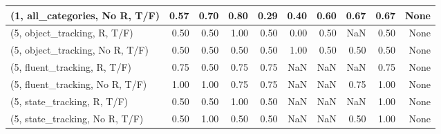 \begin{table*}[h!]
\begin{adjustbox}{width=2\columnwidth,center}
\begin{tabular}{lrrr|rrr|rrr}
(1, all\_categories, No R, T/F)       &                      0.57 &                  0.70 &                      0.80 &                          0.29 &                      0.40 &                          0.60 &                                   0.67 &                               0.67 &                                  None \\



\midrule
(5, object\_tracking, R, T/F)         &                      0.50 &                  0.50 &                      1.00 &                          0.50 &                      0.00 &                          0.50 &                                    NaN &                               0.50 &                                  None \\
(5, object\_tracking, No R, T/F)      &                      0.50 &                  0.50 &                      0.50 &                          0.50 &                      1.00 &                          0.50 &                                   0.50 &                               0.50 &                                  None \\
(5, fluent\_tracking, R, T/F)         &                      0.75 &                  0.50 &                      0.75 &                          0.75 &                       NaN &                           NaN &                                    NaN &                               0.75 &                                  None \\
(5, fluent\_tracking, No R, T/F)      &                      1.00 &                  1.00 &                      0.75 &                          0.75 &                       NaN &                           NaN &                                   0.75 &                               1.00 &                                  None \\
(5, state\_tracking, R, T/F)          &                      0.50 &                  0.50 &                      1.00 &                          0.50 &                       NaN &                           NaN &                                    NaN &                               1.00 &                                  None \\
(5, state\_tracking, No R, T/F)       &                      0.50 &                  1.00 &                      0.50 &                          0.50 &                       NaN &                           NaN &                                   0.50 &                               1.00 &                                  None \\

\end{tabular}
\end{adjustbox}
\end{table*}
